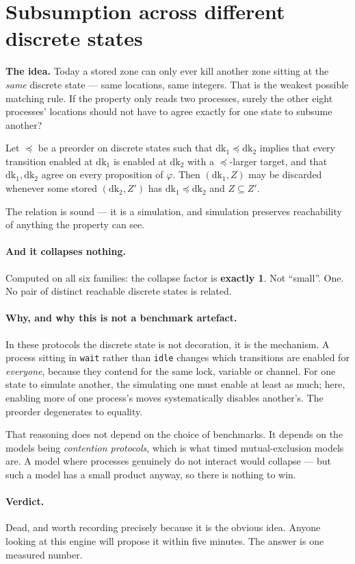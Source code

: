 \section{Subsumption across different discrete states \hfill \dead{}}

\textbf{The idea.} Today a stored zone can only ever kill another zone sitting at the \emph{same}
discrete state --- same locations, same integers. That is the weakest possible matching rule. If
the property only reads two processes, surely the other eight processes' locations should not have
to agree exactly for one state to subsume another?

\begin{theorem}
Let $\preceq$ be a preorder on discrete states such that $\mathrm{dk}_1 \preceq \mathrm{dk}_2$
implies that every transition enabled at $\mathrm{dk}_1$ is enabled at $\mathrm{dk}_2$ with a
$\preceq$-larger target, and that $\mathrm{dk}_1, \mathrm{dk}_2$ agree on every proposition of
$\varphi$. Then $(\mathrm{dk}_1, Z)$ may be discarded whenever some stored $(\mathrm{dk}_2, Z')$
has $\mathrm{dk}_1 \preceq \mathrm{dk}_2$ and $Z \subseteq Z'$.
\end{theorem}

The relation is sound --- it is a simulation, and simulation preserves reachability of anything the
property can see.

\paragraph{And it collapses nothing.} Computed on all six families: the collapse factor is
\textbf{exactly 1}. Not ``small''. One. No pair of distinct reachable discrete states is related.

\paragraph{Why, and why this is not a benchmark artefact.} In these protocols the discrete state is
not decoration, it is the mechanism. A process sitting in \texttt{wait} rather than \texttt{idle}
changes which transitions are enabled for \emph{everyone}, because they contend for the same lock,
variable or channel. For one state to simulate another, the simulating one must enable at least as
much; here, enabling more of one process's moves systematically disables another's. The preorder
degenerates to equality.

That reasoning does not depend on the choice of benchmarks. It depends on the models being
\emph{contention protocols}, which is what timed mutual-exclusion models are. A model where
processes genuinely do not interact would collapse --- but such a model has a small product anyway,
so there is nothing to win.

\paragraph{Verdict.} Dead, and worth recording precisely because it is the obvious idea. Anyone
looking at this engine will propose it within five minutes. The answer is one measured number.
